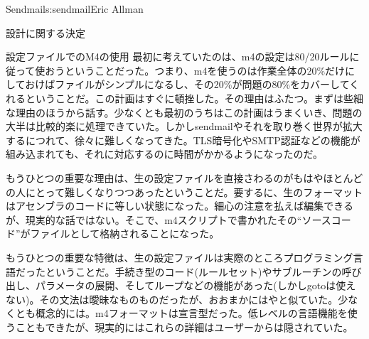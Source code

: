 \begin{aosachapter}{Sendmail}{s:sendmail}{Eric Allman}
\begin{aosasect1}{設計に関する決定}
\begin{aosasect2}{設定ファイルでのM4の使用}
最初に考えていたのは、m4の設定は80/20ルールに従って使おうということだった。つまり、m4を使うのは作業全体の20\%だけにしておけばファイルがシンプルになるし、その20\%が問題の80\%をカバーしてくれるということだ。この計画はすぐに頓挫した。その理由はふたつ。まずは些細な理由のほうから話す。少なくとも最初のうちはこの計画はうまくいき、問題の大半は比較的楽に処理できていた。しかしsendmailやそれを取り巻く世界が拡大するにつれて、徐々に難しくなってきた。TLS暗号化やSMTP認証などの機能が組み込まれても、それに対応するのに時間がかかるようになったのだ。

もうひとつの重要な理由は、生の設定ファイルを直接さわるのがもはやほとんどの人にとって難しくなりつつあったということだ。要するに、生のフォーマットはアセンブラのコードに等しい状態になった。細心の注意を払えば編集できるが、現実的な話ではない。そこで、m4スクリプトで書かれたその``ソースコード''がファイルとして格納されることになった。

もうひとつの重要な特徴は、生の設定ファイルは実際のところプログラミング言語だったということだ。手続き型のコード(ルールセット)やサブルーチンの呼び出し、パラメータの展開、そしてループなどの機能があった(しかしgotoは使えない)。その文法は曖昧なものものだったが、おおまかにはやと似ていた。少なくとも概念的には。m4フォーマットは宣言型だった。低レベルの言語機能を使うこともできたが、現実的にはこれらの詳細はユーザーからは隠されていた。


\end{aosasect2}
\end{aosasect1}
\end{aosachapter}

